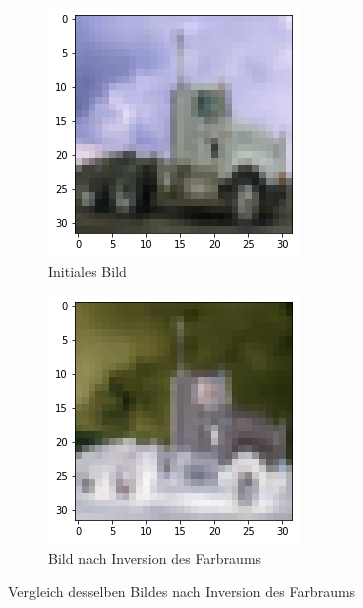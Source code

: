 \begin{figure}[htb]
	\begin{subfigure}[ht]{.5\textwidth}
		\includegraphics[width=\textwidth]{images/flip}
		\caption{Initiales Bild}
		\label{fig:inversion}
	\end{subfigure}\hfill%
	\begin{subfigure}[ht]{.5\textwidth}
		\includegraphics[width=\textwidth]{images/inversion_a}
		\caption{Bild nach Inversion des Farbraums}
		\label{fig:inversion_a}
	\end{subfigure}\hfill%
	\caption{Vergleich desselben Bildes nach Inversion des Farbraums}
\end{figure}
\newpage
